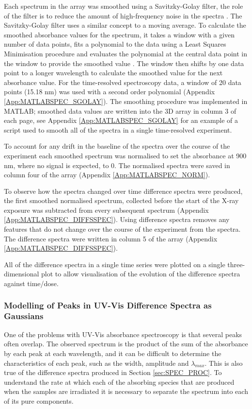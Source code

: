 Each spectrum in the array was smoothed using a Savitzky-Golay filter, the role of the filter is to reduce the amount of high-frequency noise in the spectra \cite{Savitzky1964}. The Savitzky-Golay filter uses a similar concept to a moving average. To calculate the smoothed absorbance values for the spectrum, it takes a window with a given number of data points, fits a polynomial to the data using a Least Squares Minimisation procedure and evaluates the polynomial at the central data point in the window to provide the smoothed value \cite{Savitzky1964}. The window then shifts by one data point to a longer wavelength to calculate the smoothed value for the next absorbance value. For the time-resolved spectroscopy data, a window of 20 data points (15.18 nm) was used with a second order polynomial (Appendix \ref{App:MATLABSPEC_SGOLAY}). The smoothing procedure was implemented in MATLAB; smoothed data values are written into the 3D array in column 3 of each page, see Appendix \ref{App:MATLABSPEC_SGOLAY} for an example of a script used to smooth all of the spectra in a single time-resolved experiment.

To account for any drift in the baseline of the spectra over the course of the experiment each smoothed spectrum was normalised to set the absorbance at 900 nm, where no signal is expected, to 0. The normalised spectra were saved in column four of the array (Appendix \ref{App:MATLABSPEC_NORM}).

To observe how the spectra changed over time difference spectra were produced, the first smoothed normalised spectrum, collected before the start of the X-ray exposure was subtracted from every subsequent spectrum (Appendix \ref{App:MATLABSPEC_DIFFSSPEC}). Using difference spectra removes any features that do not change over the course of the experiment from the spectra. The difference spectra were written in column 5 of the array (Appendix \ref{App:MATLABSPEC_DIFFSSPEC}).

All of the difference spectra in a single time series were plotted on a single three-dimensional plot to allow visualisation of the evolution of the difference spectra against time/dose.  

\newpage
\subsubsection{Modelling of Peaks in UV-Vis Difference Spectra as Gaussians}\label{sec:Methods_Gaussian_Modelling}
One of the problems with UV-Vis absorbance spectroscopy is that several peaks often overlap. The observed spectrum is the product of the sum of the absorbance by each peak at each wavelength, and it can be difficult to determine the characteristics of each peak, such as the width, amplitude and $\lambda_{max}$. This is also true of the difference spectra produced in Section \ref{sec:SPEC_PROC}. To understand the rate at which each of the absorbing species that are produced when the samples are irradiated it is necessary to separate the spectrum into each of its pure components.

